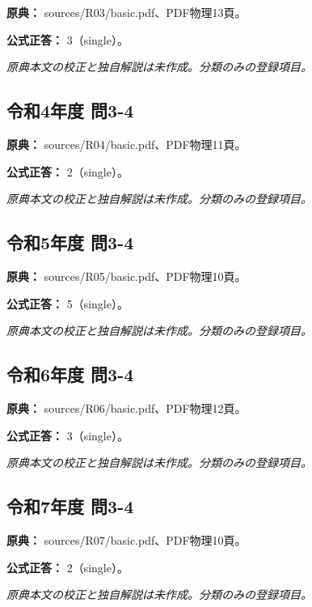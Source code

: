 \noindent\textbf{原典：} sources/R03/basic.pdf、PDF物理13頁。

\textbf{公式正答：} 3（single）。

\par\textit{原典本文の校正と独自解説は未作成。分類のみの登録項目。}

\subsection{令和4年度 問3-4}
\label{q:r04-reg-basic-3-4}

\noindent\textbf{原典：} sources/R04/basic.pdf、PDF物理11頁。

\textbf{公式正答：} 2（single）。

\par\textit{原典本文の校正と独自解説は未作成。分類のみの登録項目。}

\subsection{令和5年度 問3-4}
\label{q:r05-reg-basic-3-4}

\noindent\textbf{原典：} sources/R05/basic.pdf、PDF物理10頁。

\textbf{公式正答：} 5（single）。

\par\textit{原典本文の校正と独自解説は未作成。分類のみの登録項目。}

\subsection{令和6年度 問3-4}
\label{q:r06-reg-basic-3-4}

\noindent\textbf{原典：} sources/R06/basic.pdf、PDF物理12頁。

\textbf{公式正答：} 3（single）。

\par\textit{原典本文の校正と独自解説は未作成。分類のみの登録項目。}

\subsection{令和7年度 問3-4}
\label{q:r07-reg-basic-3-4}

\noindent\textbf{原典：} sources/R07/basic.pdf、PDF物理10頁。

\textbf{公式正答：} 2（single）。

\par\textit{原典本文の校正と独自解説は未作成。分類のみの登録項目。}

